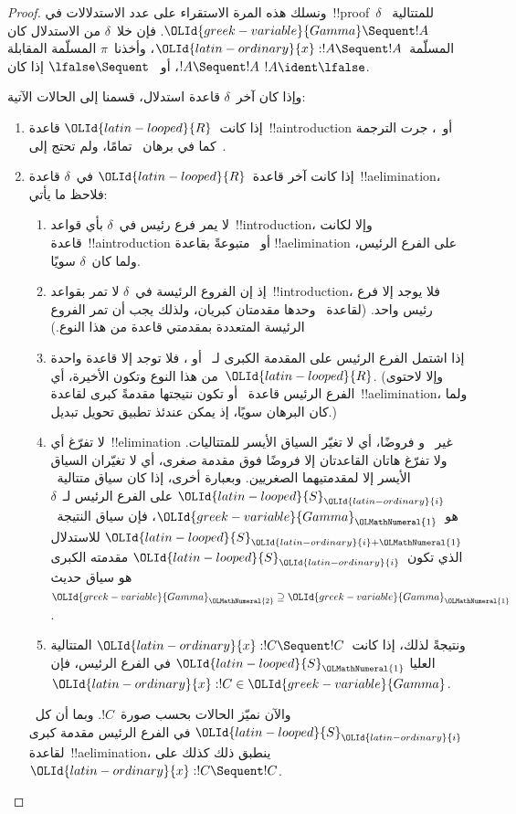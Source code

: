 \documentclass[../../../include/open-logic-section]{subfiles}
\begin{document}
\begin{proof}
ونسلك هذه المرة الاستقراء على عدد الاستدلالات في~!!{proof}~$\delta$
للمتتالية~$\OLId{greek-variable}{Gamma} \Sequent !A$. فإن خلا~$\delta$ من الاستدلال كان
المسلّمة~$\OLId{latin-ordinary}{x}:!A \Sequent !A$، وأخذنا~$\pi$ المسلّمة المقابلة
$!A \Sequent !A$، أو~$\lfalse \Sequent \ $ إذا كان
$!A\ident\lfalse$.

وإذا كان آخر~$\delta$ قاعدة استدلال، قسمنا إلى الحالات الآتية:
\begin{enumerate}
  \item إذا كانت~$\OLId{latin-looped}{R}$ قاعدة~!!a{introduction} أو~\FalseInt، جرت الترجمة
  كما في برهان~ تمامًا، ولم تحتج إلى~\Cut.

  \item إذا كانت آخر قاعدة~$\OLId{latin-looped}{R}$ في~$\delta$ قاعدة~!!a{elimination}، فلاحظ
  ما يأتي:
  \begin{enumerate}
    \item لا يمر فرع رئيس في~$\delta$ بأي قواعد~!!{introduction}، وإلا
    لكانت قاعدة~!!a{introduction} أو~\FalseInt{} متبوعةً بقاعدة
    !!a{elimination} على الفرع الرئيس، ولما كان~$\delta$ سويًا.
    \item إذ إن الفروع الرئيسة في~$\delta$ لا تمر بقواعد~!!{introduction}،
    فلا يوجد إلا فرع رئيس واحد. (لقاعدة~\Intro{\land} وحدها مقدمتان
    كبريان، ولذلك يجب أن تمر الفروع الرئيسة المتعددة بمقدمتي قاعدة من هذا
    النوع.)
    \item إذا اشتمل الفرع الرئيس على المقدمة الكبرى لـ~\Elim{\lor} أو
    \Elim{\lexists}، فلا توجد إلا قاعدة واحدة من هذا النوع وتكون الأخيرة،
    أي~$\OLId{latin-looped}{R}$. (وإلا لاحتوى الفرع الرئيس قاعدة~\Elim{\lor} أو
    \Elim{\lexists} تكون نتيجتها مقدمةً كبرى لقاعدة~!!a{elimination}، ولما
    كان البرهان سويًا، إذ يمكن عندئذ تطبيق تحويل تبديل.)
    \item لا تفرّغ أي~!!{elimination} غير~\Elim{\lor} و\Elim{\lexists}
    فروضًا، أي لا تغيّر السياق الأيسر للمتتاليات. ولا تفرّغ هاتان القاعدتان
    إلا فروضًا فوق مقدمة صغرى، أي لا تغيّران السياق الأيسر إلا لمقدمتيهما
    الصغريين. وبعبارة أخرى، إذا كان سياق متتالية~$\OLId{latin-looped}{S}_\OLId{latin-ordinary}{i}$ على الفرع الرئيس
    لـ~$\delta$ هو~$\OLId{greek-variable}{Gamma}_\OLMathNumeral{1}$، فإن سياق النتيجة~$\OLId{latin-looped}{S}_{\OLId{latin-ordinary}{i}+\OLMathNumeral{1}}$ للاستدلال الذي
    تكون~$\OLId{latin-looped}{S}_\OLId{latin-ordinary}{i}$ مقدمته الكبرى هو سياق حديث~$\OLId{greek-variable}{Gamma}_\OLMathNumeral{2} \supseteq \OLId{greek-variable}{Gamma}_\OLMathNumeral{1}$.
    \item ونتيجةً لذلك، إذا كانت~$\OLId{latin-ordinary}{x}:!C \Sequent !C$ المتتالية العليا
    $\OLId{latin-looped}{S}_\OLMathNumeral{1}$ في الفرع الرئيس، فإن~$\OLId{latin-ordinary}{x}:!C \in \OLId{greek-variable}{Gamma}$.
  \end{enumerate}
  والآن نميّز الحالات بحسب صورة~$!C$. وبما أن كل~$\OLId{latin-looped}{S}_\OLId{latin-ordinary}{i}$ في الفرع الرئيس
  مقدمة كبرى لقاعدة~!!a{elimination}، ينطبق ذلك كذلك على
  $\OLId{latin-ordinary}{x}:!C \Sequent !C$.


\end{enumerate}
\end{proof}
\end{document}
